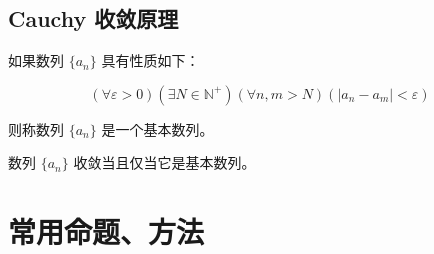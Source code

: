 \documentclass[lang=cn,10pt,twoside]{elegantbook}
\begin{document}
\subsection{Cauchy 收敛原理}
\begin{definition}[基本数列]
  如果数列 $\{a_n\}$ 具有性质如下：

  $$(\forall \varepsilon>0)(\exists N \in \mathbb N^+)(\forall n, m > N)(|a_n - a_m| < \varepsilon)$$

  则称数列 $\{a_n\}$ 是一个基本数列。

\end{definition}
\begin{theorem}
  数列 $\{a_n\}$ 收敛当且仅当它是基本数列。
\end{theorem}

\section{常用命题、方法}
\end{document}
